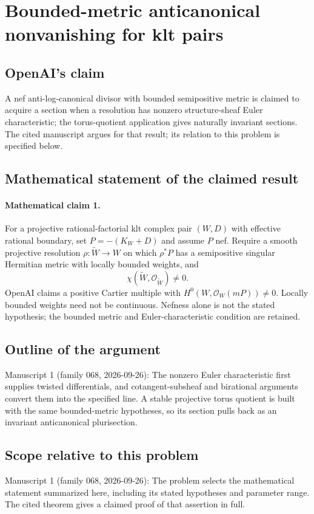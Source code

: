 \documentclass[11pt]{article}
\begin{document}
\section*{Bounded-metric anticanonical nonvanishing for klt pairs}

\subsection{OpenAI's claim}
A nef anti-log-canonical divisor with bounded semipositive metric is claimed to acquire a section when a resolution has nonzero structure-sheaf Euler characteristic; the torus-quotient application gives naturally invariant sections. The cited manuscript argues for that result; its relation to this problem is specified below.

\subsection{Mathematical statement of the claimed result}
\paragraph{Mathematical claim 1.} For a projective rational-factorial klt complex pair $(W,D)$ with effective rational boundary, set $P=-(K_W+D)$ and assume $P$ nef. Require a smooth projective resolution $\rho:\widetilde W\to W$ on which $\rho^*P$ has a semipositive singular Hermitian metric with locally bounded weights, and
\[
\chi(\widetilde W,\mathcal O_{\widetilde W})\ne0.
\]
OpenAI claims a positive Cartier multiple with $H^0(W,\mathcal O_W(mP))\ne0$. Locally bounded weights need not be continuous. Nefness alone is not the stated hypothesis; the bounded metric and Euler-characteristic condition are retained.

\subsection{Outline of the argument}
Manuscript 1 (family 068, 2026-09-26): The nonzero Euler characteristic first supplies twisted differentials, and cotangent-subsheaf and birational arguments convert them into the specified line. A stable projective torus quotient is built with the same bounded-metric hypotheses, so its section pulls back as an invariant anticanonical plurisection.

\subsection{Scope relative to this problem}
Manuscript 1 (family 068, 2026-09-26): The problem selects the mathematical statement summarized here, including its stated hypotheses and parameter range. The cited theorem gives a claimed proof of that assertion in full.
\end{document}
